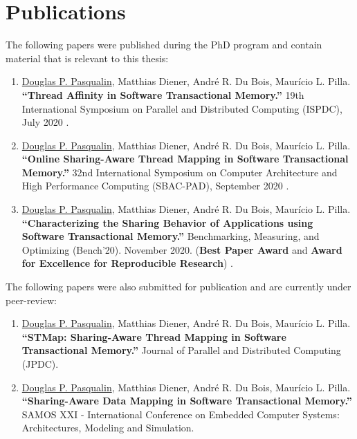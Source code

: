 \section{Publications}

The following papers were published during the PhD program and contain material that is relevant to this thesis:

\begin{enumerate}
	\item \underline{Douglas P. Pasqualin}, Matthias Diener, André R. Du Bois, Maurício L. Pilla. \textbf{``Thread Affinity in Software Transactional Memory.''}  19th International Symposium on Parallel and Distributed Computing (ISPDC), July 2020 \cite{Pasqualin:2020}.
	
	\item \underline{Douglas P. Pasqualin}, Matthias Diener, André R. Du Bois, Maurício L. Pilla. \textbf{``Online Sharing-Aware Thread Mapping in Software Transactional Memory.''}  32nd International Symposium on Computer Architecture and High Performance Computing (SBAC-PAD), September 2020 \cite{Pasqualin:2020:2}.
	
	\item \underline{Douglas P. Pasqualin}, Matthias Diener, André R. Du Bois, Maurício L. Pilla. \textbf{``Characterizing the Sharing Behavior of Applications using  Software Transactional Memory.''} Benchmarking, Measuring, and Optimizing (Bench'20). November 2020. (\textbf{Best Paper Award} and \textbf{Award for Excellence for Reproducible Research}) \cite{Pasqualin:Bench}.
\end{enumerate}

The following papers were also submitted for publication and are currently under peer-review:

\begin{enumerate}
	\item \underline{Douglas P. Pasqualin}, Matthias Diener, André R. Du Bois, Maurício L. Pilla. \textbf{``STMap: Sharing-Aware Thread Mapping in Software Transactional Memory.''} Journal of Parallel and Distributed Computing (JPDC).
	
	\item \underline{Douglas P. Pasqualin}, Matthias Diener, André R. Du Bois, Maurício L. Pilla. \textbf{``Sharing-Aware Data Mapping in Software Transactional Memory.''} SAMOS XXI - International Conference on Embedded Computer Systems: Architectures, Modeling and Simulation. 
\end{enumerate}


